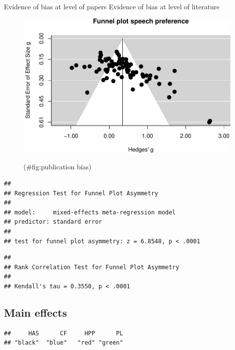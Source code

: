 \documentclass[man]{apa6}
\begin{document}
Evidence of bias at level of papers Evidence of bias at level of
literature

\begin{figure}

{\centering \includegraphics{MA_speech_pref_files/figure-latex/publication bias-1} 

}

\caption{ }(\#fig:publication bias)
\end{figure}

\begin{verbatim}
## 
## Regression Test for Funnel Plot Asymmetry
## 
## model:     mixed-effects meta-regression model
## predictor: standard error
## 
## test for funnel plot asymmetry: z = 6.8548, p < .0001
\end{verbatim}

\begin{verbatim}
## 
## Rank Correlation Test for Funnel Plot Asymmetry
## 
## Kendall's tau = 0.3550, p < .0001
\end{verbatim}

\subsection{Main effects}\label{main-effects}

\begin{verbatim}
##     HAS      CF     HPP      PL 
## "black"  "blue"   "red" "green"
\end{verbatim}
\end{document}
